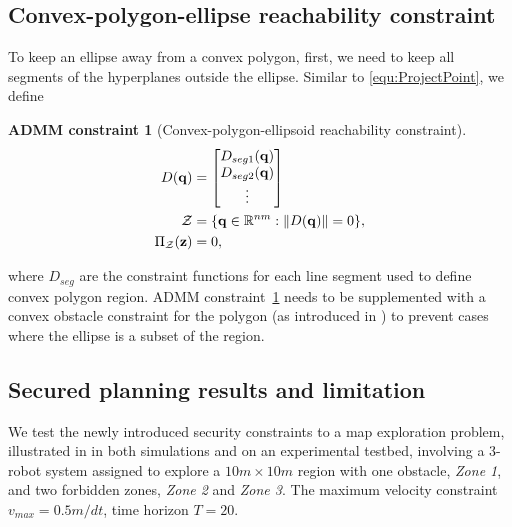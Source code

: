 \documentclass[10pt,twocolumn,twoside]{IEEEtran}
\newtheorem{constraint}{ADMM constraint}
\def\sZ{\mathcal{Z}}
\begin{document}
\subsection{Convex-polygon-ellipse reachability constraint}\label{sec:ellipse-region-constraint} 
To keep an ellipse away from a convex polygon, first, we need to keep all segments of the hyperplanes outside the ellipse. Similar to \eqref{equ:ProjectPoint}, we define
\begin{constraint}[Convex-polygon-ellipsoid reachability constraint]\label{constraint:polygon-ellipsoid}
\begin{align}
D(\vq) &= \bmat{D_{seg1}(\vq)\\D_{seg2}(\vq)\\ \vdots} \label{eq:region_ellipsoid_constraint}\\
  \sZ &= \{\vq\in\mathbb{R}^{nm}:\norm{D(\vq)} = 0 \},\\
   \Pi_\sZ(\vz) & = 0, 
\end{align}
\end{constraint}
where $D_{seg}$ are the constraint functions for each line segment used to define convex polygon region. ADMM constraint~\ref{constraint:polygon-ellipsoid} needs to be supplemented with a convex obstacle constraint for the polygon (as introduced in \cite{yang2020multi}) to prevent cases where the ellipse is a subset of the region.

\subsection{Secured planning results and limitation}\label{sec:ADMM-simulation}

We test the newly introduced security constraints to a map exploration problem, illustrated in  in both simulations and on an experimental testbed, involving a 3-robot system assigned to explore a $10m\times10m$ region with one obstacle, \emph{Zone 1}, and two forbidden zones, \emph{Zone 2} and \emph{Zone 3}. The maximum velocity constraint $v_{max}=0.5m/dt$, time horizon $T=20$. %
\end{document}
